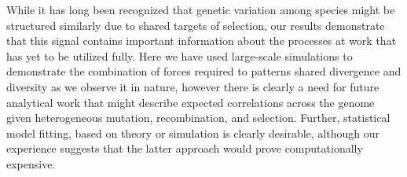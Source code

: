While it has long been recognized that genetic variation among species might be
structured similarly due to shared targets of selection, our results demonstrate
that this signal contains important information about the processes at work that has yet to be utilized fully.
Here we have used large-scale simulations to demonstrate the combination of forces required 
to patterns shared divergence and diversity as we observe it in nature, however
there is clearly a need for future analytical work that might describe expected
correlations across the genome given heterogeneous mutation, recombination,
and selection. Further, statistical model fitting, based on theory or
simulation is clearly desirable, although our experience suggests that the latter
approach would prove computationally expensive. 
